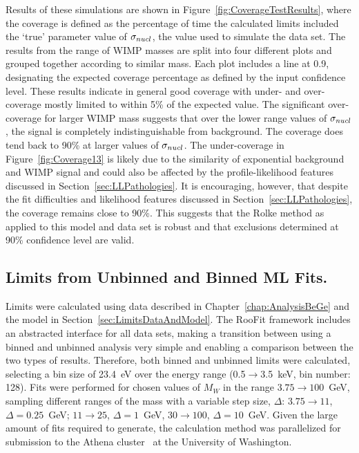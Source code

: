 Results of these simulations are shown in Figure~\ref{fig:CoverageTestResults}, where the coverage is defined as the percentage of time the calculated limits included the `true' parameter value of $\sigma_{nucl}$, the value used to simulate the data set.  The results from the range of WIMP masses are split into four different plots and grouped together according to similar mass.  Each plot includes a line at 0.9, designating the expected coverage percentage as defined by the input confidence level.  These results indicate in general good coverage with under- and over-coverage mostly limited to within 5\% of the expected value.  The significant over-coverage for larger WIMP mass suggests that over the lower range values of $\sigma_{nucl}$, the signal is completely indistinguishable from background.  The coverage does tend back to 90\% at larger values of $\sigma_{nucl}$.  The under-coverage in Figure~\ref{fig:Coverage13} is likely due to the similarity of exponential background and WIMP signal and could also be affected by the profile-likelihood features discussed in Section~\ref{sec:LLPathologies}.  It is encouraging, however, that despite the fit difficulties and likelihood features discussed in Section~\ref{sec:LLPathologies}, the coverage remains close to 90\%.  This suggests that the Rolke method as applied to this model and data set is robust and that exclusions determined at 90\% confidence level are valid.

		\subsection{Limits from Unbinned and Binned ML Fits.}
		\label{sec:LimitsUnbinned}

Limits were calculated using data described in Chapter~\ref{chap:AnalysisBeGe} and the model in Section~\ref{sec:LimitsDataAndModel}.  The RooFit framework includes an abstracted interface for all data sets, making a transition between using a binned and unbinned analysis very simple and enabling a comparison between the two types of results.  Therefore, both binned and unbinned limits were calculated, selecting a bin size of 23.4~eV over the energy range (0.5$\to$3.5~keV, bin number: 128).  
Fits were performed for chosen values of $M_{W}$ in the range $3.75\to100$~GeV, sampling different ranges of the mass with a variable step size, $\Delta$: $3.75\to11$, $\Delta=0.25$~GeV; $11\to25$, $\Delta=1$~GeV, $30\to100$, $\Delta=10$~GeV.  Given the large amount of fits required to generate, the calculation method was parallelized for submission to the Athena cluster~\cite{Athena} at the University of Washington.  
